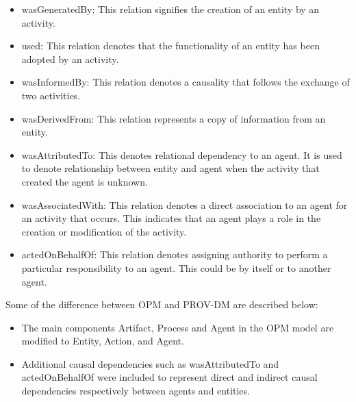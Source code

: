 \begin{itemize}
\item wasGeneratedBy: This relation signifies the creation of an entity by an activity. 

\item used: This relation denotes that the functionality of an entity has been adopted by an activity.

\item wasInformedBy: This relation denotes a causality that follows the exchange of two activities.

\item wasDerivedFrom: This relation represents a copy of information from an entity. 

\item wasAttributedTo: This denotes relational dependency to an agent. It is used to denote relationship between entity and agent when the activity that created the agent is unknown.

\item wasAssociatedWith: This relation denotes a direct association to an agent for an activity that occurs. This indicates that an agent plays a role in the creation or modification of the activity.

\item actedOnBehalfOf: This relation denotes assigning authority to perform a particular responsibility to an agent. This could be by itself or to another agent.



\end{itemize}

Some of the difference between OPM and PROV-DM are described below:

\begin{itemize}

\item The main components Artifact, Process and Agent in the OPM model are modified to Entity, Action, and Agent. 

\item Additional causal dependencies such as wasAttributedTo and actedOnBehalfOf were included to represent direct and indirect causal dependencies respectively between agents and entities.

\end{itemize}


